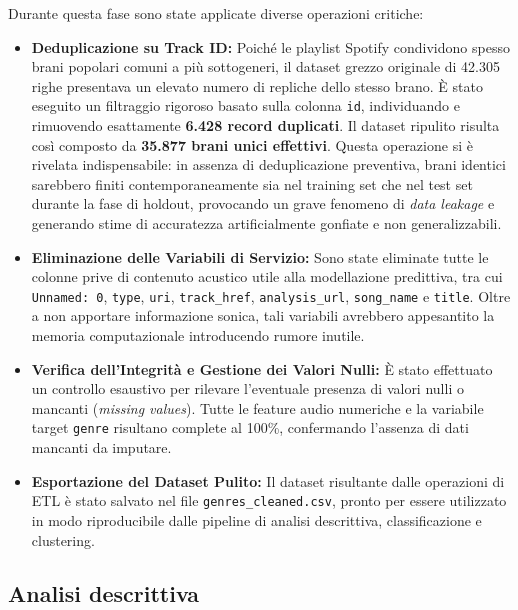 \documentclass[12pt,a4paper]{article}
\begin{document}
Durante questa fase sono state applicate diverse operazioni critiche:

\begin{itemize}
    \item \textbf{Deduplicazione su Track ID:} Poiché le playlist Spotify condividono spesso brani popolari comuni a più sottogeneri, il dataset grezzo originale di 42.305 righe presentava un elevato numero di repliche dello stesso brano. È stato eseguito un filtraggio rigoroso basato sulla colonna \texttt{id}, individuando e rimuovendo esattamente \textbf{6.428 record duplicati}. Il dataset ripulito risulta così composto da \textbf{35.877 brani unici effettivi}. 
    Questa operazione si è rivelata indispensabile: in assenza di deduplicazione preventiva, brani identici sarebbero finiti contemporaneamente sia nel training set che nel test set durante la fase di holdout, provocando un grave fenomeno di \textit{data leakage} e generando stime di accuratezza artificialmente gonfiate e non generalizzabili.
    
    \item \textbf{Eliminazione delle Variabili di Servizio:} Sono state eliminate tutte le colonne prive di contenuto acustico utile alla modellazione predittiva, tra cui \texttt{Unnamed: 0}, \texttt{type}, \texttt{uri}, \texttt{track\_href}, \texttt{analysis\_url}, \texttt{song\_name} e \texttt{title}. Oltre a non apportare informazione sonica, tali variabili avrebbero appesantito la memoria computazionale introducendo rumore inutile.
    
    \item \textbf{Verifica dell'Integrità e Gestione dei Valori Nulli:} È stato effettuato un controllo esaustivo per rilevare l'eventuale presenza di valori nulli o mancanti (\textit{missing values}). Tutte le feature audio numeriche e la variabile target \texttt{genre} risultano complete al 100\%, confermando l'assenza di dati mancanti da imputare.
    
    \item \textbf{Esportazione del Dataset Pulito:} Il dataset risultante dalle operazioni di ETL è stato salvato nel file \texttt{genres\_cleaned.csv}, pronto per essere utilizzato in modo riproducibile dalle pipeline di analisi descrittiva, classificazione e clustering.
\end{itemize}

\newpage
\subsection{Analisi descrittiva}
\end{document}
